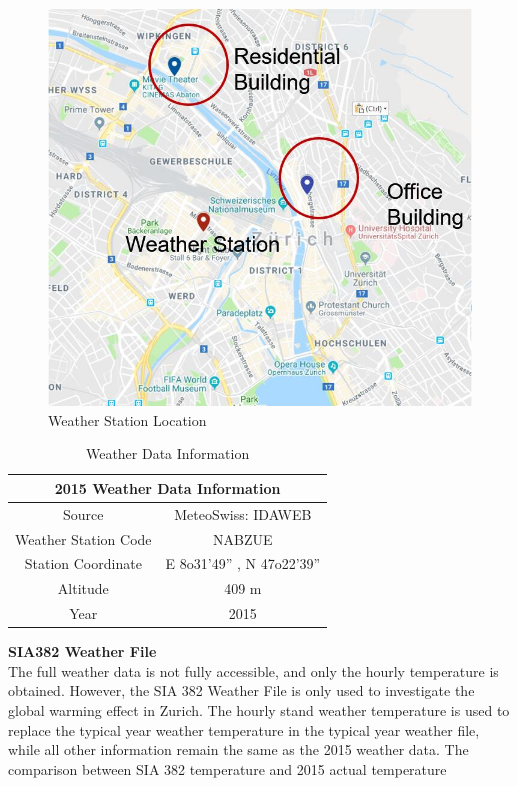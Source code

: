 \documentclass[11pt, a4paper]{article}
\theoremstyle{definition}
\begin{document}
				\begin{figure}[H]
				\centering
				\includegraphics[scale=0.7]{WeatherStation.jpg}
				\caption{Weather Station Location}
				\label{fig:NABZUE}
				\end{figure}
				
				\begin{table}[htbp]
				  \centering
				  \caption{Weather Data Information}
				    \begin{tabular}{|c|c|}
				    \toprule
				    \multicolumn{2}{|c|}{\textbf{2015 Weather Data Information}} \\
				    \midrule
				    Source & MeteoSwiss: IDAWEB \\
				    \midrule
				    Weather Station Code & NABZUE \\
				    \midrule
				    Station Coordinate & E 8o31’49” , N 47o22’39” \\
				    \midrule
				    Altitude & 409 m \\
				    \midrule
				    Year & 2015 \\
				    \bottomrule
				    \end{tabular}%
				  \label{tab:2015DataInformation}%
				\end{table}%



			\textbf{SIA382 Weather File}\\
				The full weather data is not fully accessible, and only the hourly temperature is obtained. However, the SIA 382 Weather File is only used to investigate the global warming effect in Zurich. The hourly stand weather temperature is used to replace the typical year weather temperature in the typical year weather file, while all other information remain the same as the 2015 weather data. The comparison between SIA 382 temperature and 2015 actual temperature \\ 
\end{document}
